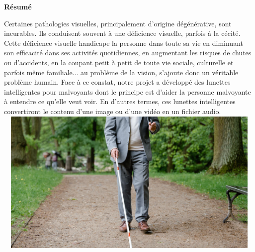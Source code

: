 
\textbf{\huge{Résumé}}\\[1cm]
\begin{center}
Certaines pathologies visuelles, principalement d'origine dégénérative, sont incurables. Ils conduisent souvent à une déficience visuelle, parfois à la cécité. Cette déficience visuelle
handicape la personne dans toute sa vie en diminuant son efficacité dans ses activités quotidiennes, en augmentant les risques de chutes ou d'accidents, en la coupant petit à petit
de toute vie sociale, culturelle et parfois même familiale... au problème de la vision, s'ajoute donc un véritable problème humain.
Face à ce constat, notre projet a développé des lunettes intelligentes pour malvoyants dont le principe est d'aider la personne malvoyante à entendre ce qu'elle veut voir. En d'autres termes, ces lunettes intelligentes convertiront le contenu d'une image ou d'une vidéo en un fichier audio. 
\\[1cm]
\includegraphics[width=14cm, height=7cm]{4-Images/visually-impaired.jpeg}\\[2cm]

\end{center}
